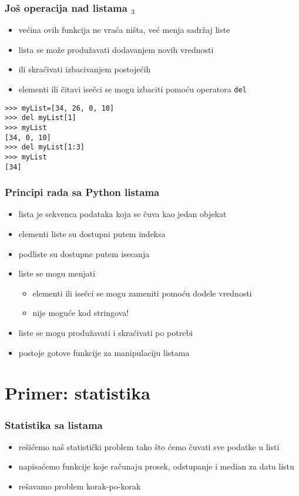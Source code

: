 \documentclass[utf8,compress]{beamer}
\begin{document}
\begin{frame}[fragile]
  \frametitle{Još operacija nad listama $_3$}
  \begin{itemize}
    \item većina ovih funkcija ne vraća ništa, već menja sadržaj liste
    \item lista se može produžavati dodavanjem novih vrednosti
    \item ili skraćivati izbacivanjem postojećih
    \item elementi ili čitavi isečci se mogu izbaciti pomoću operatora \texttt{del}
  \end{itemize}
\begin{verbatim}
>>> myList=[34, 26, 0, 10]
>>> del myList[1]
>>> myList
[34, 0, 10]
>>> del myList[1:3]
>>> myList
[34]
\end{verbatim}
\end{frame}

\begin{frame}[fragile]
  \frametitle{Principi rada sa Python listama}
  \begin{itemize}
    \item lista je sekvenca podataka koja se čuva kao jedan objekat
    \item elementi liste su dostupni putem indeksa
    \item podliste su dostupne putem isecanja
    \item liste se mogu menjati
    \begin{itemize}
      \item elementi ili isečci se mogu zameniti pomoću dodele vrednosti
      \item nije moguće kod stringova!
    \end{itemize}
    \item liste se mogu produžavati i skraćivati po potrebi
    \item postoje gotove funkcije za manipulaciju listama
  \end{itemize}
\end{frame}

\section[Primer]{Primer: statistika}

\begin{frame}[fragile]
  \frametitle{Statistika sa listama}
  \begin{itemize}
    \item rešićemo naš statistički problem tako što ćemo čuvati sve podatke u listi
    \item napisaćemo funkcije koje računaju prosek, odstupanje i median za datu listu
    \item rešavamo problem korak-po-korak
  \end{itemize}
\end{frame}
\end{document}
